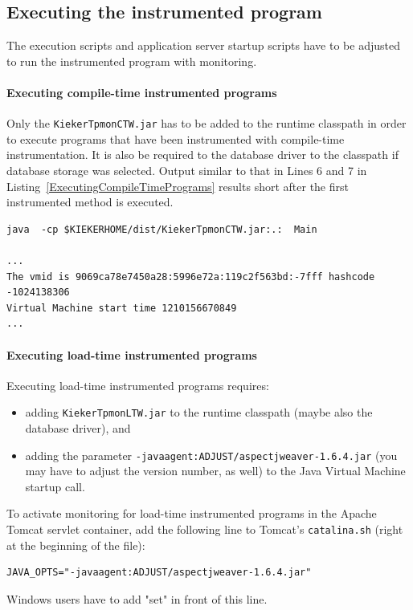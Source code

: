 \documentclass[a4paper,12pt]{scrartcl}
\begin{document}
\subsection{Executing the instrumented program}
The execution scripts and application server startup scripts have to be adjusted to run the instrumented program with monitoring.

\paragraph{Executing compile-time instrumented programs}
Only the \texttt{KiekerTpmonCTW.jar} has to be added to the runtime classpath in order to execute programs that have been instrumented with compile-time instrumentation. It is also be required to the database driver to the classpath if database storage was selected. Output similar to that in Lines 6 and 7 in Listing~\ref{ExecutingCompileTimePrograms} results short after the first instrumented method is executed.

\begin{lstlisting}[caption={Execution of a compile-time instrumented program},label={ExecutingCompileTimePrograms}]
java  -cp $KIEKERHOME/dist/KiekerTpmonCTW.jar:.:  Main

...
The vmid is 9069ca78e7450a28:5996e72a:119c2f563bd:-7fff hashcode -1024138306
Virtual Machine start time 1210156670849
...
\end{lstlisting}

\paragraph{Executing load-time instrumented programs}
Executing load-time instrumented programs requires:
\begin{itemize}
\item adding \texttt{KiekerTpmonLTW.jar} to the runtime classpath (maybe also the database driver), and
\item adding the parameter \texttt{-javaagent:ADJUST/aspectjweaver-1.6.4.jar} (you may have to adjust the version number, as well) to the Java Virtual Machine startup call.
\end{itemize}

To activate monitoring for load-time instrumented programs in the Apache Tomcat servlet container, add the following line to Tomcat's \texttt{catalina.sh} (right at the beginning of the file):
\begin{lstlisting}[caption={}]
JAVA_OPTS="-javaagent:ADJUST/aspectjweaver-1.6.4.jar"
\end{lstlisting}
Windows users have to add "set" in front of this line.
\end{document}
